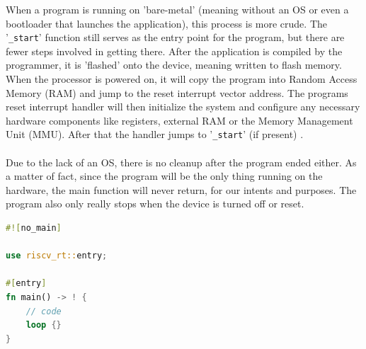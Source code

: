 When a program is running on 'bare-metal' (meaning without an OS or even a bootloader that launches the  application), this process is more crude.
The '\lstinline{_start}' function still serves as the entry point for the program, but there are fewer steps involved in getting there.
After the application is compiled by the programmer, it is 'flashed' onto the device, meaning written to flash memory.
When the processor is powered on, it will copy the program into Random Access Memory (RAM) and jump to the reset interrupt vector address.
The programs reset interrupt handler will then initialize the system and configure any necessary hardware components
like registers, external RAM or the Memory Management Unit (MMU).
After that the handler jumps to '\lstinline{_start}' (if present) \cite{before_main}.\\\\
Due to the lack of an OS, there is no cleanup after the program ended either.
As a matter of fact, since the program will be the only thing running on the hardware,
the main function will never return, for our intents and purposes.
The program also only really stops when the device is turned off or reset.

\begin{lstlisting}[style=colorEX,language=Rust,caption={Example main function for the pulp-platform},label={code:embedded_main}]
#![no_main]

use riscv_rt::entry;

#[entry]
fn main() -> ! {
    // code
    loop {}
}
\end{lstlisting}

